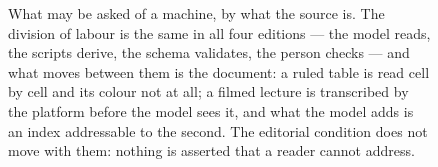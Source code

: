 \begin{figure}[htbp]
\begin{tikzpicture}
\end{tikzpicture}
\caption{What may be asked of a machine, by what the source is. The division of
labour is the same in all four editions — the model reads, the scripts derive,
the schema validates, the person checks — and what moves between them is the
document: a ruled table is read cell by cell and its colour not at all; a
filmed lecture is transcribed by the platform before the model sees it, and
what the model adds is an index addressable to the second. The editorial
condition does not move with them: nothing is asserted that a reader cannot
address.}\label{fig:sources}
\end{figure}
